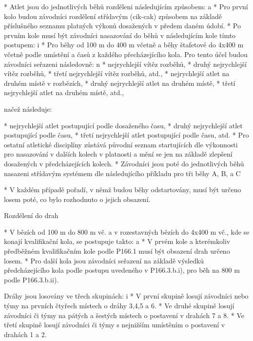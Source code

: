 * Atlet jsou do jednotlivých běhů rozděleni následujícím způsobem:
  \begitems \style a
  * Pro první kolo budou závodníci rozdělení střídavým (cik-cak) způsobem na základě příslušného seznamu platných výkonů dosažených v předem daném údobí.
  * Po prvním kole musí být závodníci nasazování do běhů v následujícím kole tímto postupem:
    \begitems \style i
    * Pro běhy od 100 m do 400 m včetně a běhy štafetové do 4x400 m včetně podle umístění a časů z každého přecházejícího kola. Pro tento účel budou závodníci seřazeni následovně:
      \begitems \style n
      * nejrychlejší vítěz rozběhů,
      * druhý nejrychlejší vítěz rozběhů,
      * třetí nejrychlejší vítěz rozběhů, atd.,
      * nejrychlejší atlet na druhém místě v rozbězích,
      * druhý nejrychlejší atlet na druhém místě,
      * třetí nejrychlejší atlet na druhém místě, atd.,

      načež následuje:

      * nejrychlejší atlet postupující podle dosaženého času,
      * druhý nejrychlejší atlet postupující podle času,
      * třetí nejrychlejší atlet postupující podle času, atd.
      \enditems
    * Pro ostatní atletické disciplíny zůstává původní seznam startujících dle výkonnosti pro nasazování v dalších kolech v platnosti a mění se jen na základě zlepšení dosažených v předcházejících kolech.
    \enditems
  * Závodníci jsou poté do jednotlivých běhů nasazeni střídavým systémem dle následujícího příkladu pro tři běhy A, B, a C


  * V každém případě pořadí, v němž budou běhy odstartovány, musí být určeno losem poté, co bylo rozhodnuto o jejich obsazení.
  \enditems

Rozdělení do drah

* V bězích od 100 m do 800 m vč. a v rozestavných bězích do 4x400 m vč., kde se konají kvalifikační kola, se postupuje takto:
  \begitems \style a
  * V prvém kole a kterémkoliv předběžném kvalifikačním kole podle P166.1 musí být obsazení drah určeno losem.
  * Pro další kola jsou závodníci seřazení na základě výsledků předcházejícího kola podle postupu uvedeného v P166.3.b.i), pro běh na 800 m podle P166.3.b.ii).

  Dráhy jsou losovány ve třech skupinách:
    \begitems \style i
    * V první skupině losují závodníci nebo týmy na prvních čtyřech místech o dráhy 3,4,5 a 6.
    * Ve druhé skupině losují závodníci či týmy na pátých a šestých místech o postavení v drahách 7 a 8.
    * Ve třetí skupině losují závodníci či týmy s nejnižším umístěním o postavení v drahách 1 a 2.
    \enditems
  \enditems


